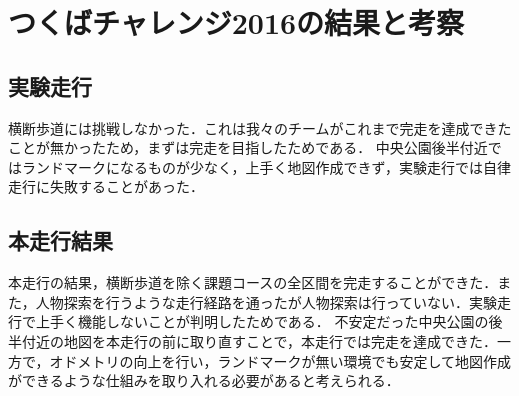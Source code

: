 \documentclass[10pt,a4paper]{jarticle}
\begin{document}
\section{つくばチャレンジ2016の結果と考察}
\subsection{実験走行}
横断歩道には挑戦しなかった．これは我々のチームがこれまで完走を達成できたことが無かったため，まずは完走を目指したためである．
中央公園後半付近ではランドマークになるものが少なく，上手く地図作成できず，実験走行では自律走行に失敗することがあった．

\subsection{本走行結果}
本走行の結果，横断歩道を除く課題コースの全区間を完走することができた．また，人物探索を行うような走行経路を通ったが人物探索は行っていない．実験走行で上手く機能しないことが判明したためである．
不安定だった中央公園の後半付近の地図を本走行の前に取り直すことで，本走行では完走を達成できた．一方で，オドメトリの向上を行い，ランドマークが無い環境でも安定して地図作成ができるような仕組みを取り入れる必要があると考えられる．
\end{document}

